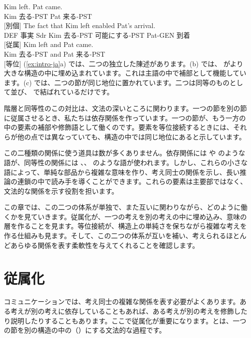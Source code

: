 \ea \label{ex:intro-ja}
    \ea \gll Kim left. Pat came.\\
        Kim 去る-PST Pat 来る-PST\\
    \glt {} [別個]
    \ex \gll The fact {\ob}that Kim left{\cb} enabled Pat's arrival.\\
        DEF 事実 Sdr Kim 去る-PST 可能にする-PST Pat-GEN 到着\\
    \glt {} [従属]
    \ex \gll Kim left and Pat came.\\
        Kim 去る-PST and Pat 来る-PST\\
    \glt {} [等位]
    \z
\z
(\ref{ex:intro-ja}a) では、二つの独立した陳述があります。(b) では、 がより大きな構造の中に埋め込まれています。これは主語の中で補部として機能しています。(c) では、二つの節が同じ地位に置かれています。二つは同等のものとして並び、 で結ばれているだけです。

階層と同等性のこの対比は、文法の深いところに関わります。一つの節を別の節に従属させるとき、私たちは依存関係を作っています。一つの節が、もう一方の中の要素の補部や修飾語として働くのです。要素を等位接続するときには、それらが他の点では異なっていても、構造の中では同じ地位にあると示しています。

この二種類の関係に使う道具は数が多くありません。依存関係には  や  のような語が、同等性の関係には 、、 のような語が使われます。しかし、これらの小さな語によって、単純な部品から複雑な意味を作り、考え同士の関係を示し、長い推論の連鎖の中で読み手を導くことができます。これらの要素は主要部ではなく、文法的な関係を示す役割を担います。

この章では、この二つの体系が単独で、また互いに関わりながら、どのように働くかを見ていきます。従属化が、一つの考えを別の考えの中に埋め込み、意味の層を作ることを見ます。等位接続が、構造上の単純さを保ちながら複雑な考えを作る仕組みも見ます。そして、この二つの体系が互いを補い、考えられるほとんどあらゆる関係を表す柔軟性を与えてくれることを確認します。

\section{従属化}\label{sec:subordination-ja}

コミュニケーションでは、考え同士の複雑な関係を表す必要がよくあります。ある考えが別の考えに依存していることもあれば、ある考えが別の考えを修飾したり説明したりすることもあります。ここで従属化が重要になります。とは、一つの節を別の構造の中の（）にする文法的な過程です。

